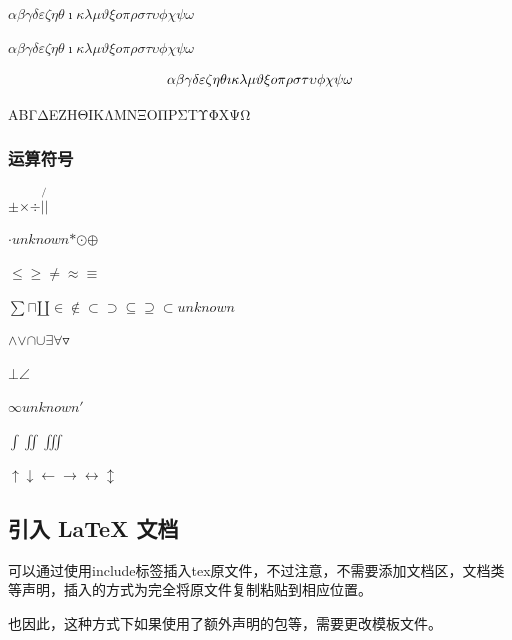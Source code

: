 \documentclass{article}%
\begin{document}
%

%
\textbf{$\alpha{}$$\beta{}$$\gamma{}$$\delta{}$$\varepsilon{}$$\zeta{}$$\eta{}$$\theta{}$$\imath{}$$\kappa{}$$\lambda{}$$\mu{}$$\vartheta{}$$\xi{}$$o{}$$\pi{}$$\rho{}$$\sigma{}$$\tau{}$$\upsilon{}$$\phi{}$$\chi{}$$\psi{}$$\omega{}$}%

%
%

%
 $\alpha{}\beta{}\gamma{}\delta{}\varepsilon{}\zeta{}\eta{}\theta{}\imath{}\kappa{}\lambda{}\mu{}\vartheta{}\xi{}o{}\pi{}\rho{}\sigma{}\tau{}\upsilon{}\phi{}\chi{}\psi{}\omega{}$ %

%

%
\[%
\alpha{}\beta{}\gamma{}\delta{}\varepsilon{}\zeta{}\eta{}\theta{}\imath{}\kappa{}\lambda{}\mu{}\vartheta{}\xi{}o{}\pi{}\rho{}\sigma{}\tau{}\upsilon{}\phi{}\chi{}\psi{}\omega{}\\%
\]%

%
%

%

%
\begin{langbox}[Tex]%
ΑΒΓΔΕΖΗΘΙΚΛΜΝΞΟΠΡΣΤΥΦΧΨΩ%
\end{langbox}%

%
%

%
\subsubsection{运算符号}%

%
$\pm{}$$\times{}$$\div{}$$|{}$$\not{|}{}$%

%
$\cdot{}$$unknown$$\ast{}$$\odot{}$$\oplus{}$%

%
$\leq{}$$\geq{}$$\neq{}$$\approx{}$$\equiv{}$%

%
$\sum{}$$\sqcap{}$$\amalg{}$$\in{}$$\notin{}$$\subset{}$$\supset{}$$\subseteq{}$$\supseteq{}$$\subset{}$$unknown$%

%
$\wedge{}$$\vee{}$$\cap{}$$\cup{}$$\exists{}$$\forall{}$$\triangledown{}$%

%
$\bot{}$$\angle{}$%

%
$\infty{}$$unknown$$'{}$%

%
$\int{}$$\iint{}$$\iiint{}$%

%
$\uparrow{}$$\downarrow{}$$\leftarrow{}$$\to{}$$\leftrightarrow{}$$\updownarrow{}$

%

%
%

%
\subsection{引入 LaTeX 文档}%

%
%

%

%
可以通过使用include标签插入tex原文件，不过注意，不需要添加文档区，文档类等声明，插入的方式为完全将原文件复制粘贴到相应位置。
%

%

%

%
也因此，这种方式下如果使用了额外声明的包等，需要更改模板文件。%

%
\end{document}
